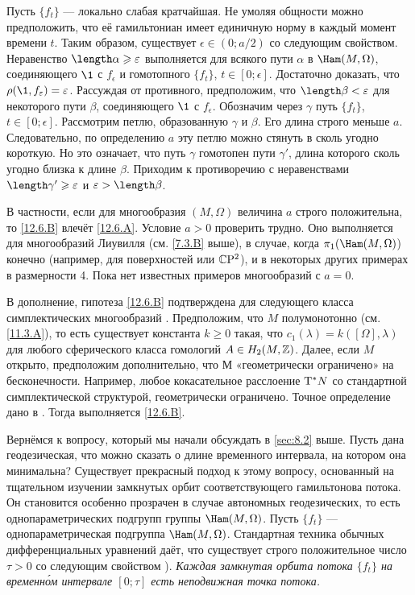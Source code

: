 Пусть $\{f_t\}$ — локально слабая кратчайшая.
Не умоляя общности можно предположить, что её гамильтониан имеет единичную норму в каждый момент времени $t$.
Таким образом, существует $\epsilon \in (0; a/2)$ со следующим свойством.
Неравенство $\length\alpha \ge \epsilon$ выполняется для всякого пути $\alpha$ в $\Ham(M, \Omega)$, соединяющего $\1$ с $f_\epsilon$ и гомотопного $\{f_t\}$, $t\in[0; \epsilon]$.
Достаточно доказать, что $\rho(\1, f_\epsilon) = \epsilon$.
Рассуждая от противного, предположим, что $\length \beta < \epsilon$ для некоторого пути $\beta$, соединяющего $\1$ с $f_\epsilon$.
Обозначим через $\gamma$ путь $\{f_t\}$, $t\in[0; \epsilon]$.
Рассмотрим петлю, образованную $\gamma$ и $\beta$.
Его длина строго меньше $a$.
Следовательно, по определению $a$ эту петлю можно стянуть в сколь угодно короткую.
Но это означает, что путь $\gamma$ гомотопен пути $\gamma'$, длина которого сколь угодно близка к длине $\beta$.
Приходим к противоречию с неравенствами $\length \gamma' \ge\epsilon$ и $\epsilon > \length \beta$.
\qeds

В частности, если для многообразия $(M,\Omega)$ величина $a$ строго положительна, то \ref{12.6.B} влечёт \ref{12.6.A}.
Условие $a > 0$ проверить трудно.
Оно выполняется для многообразий Лиувилля (см. \ref{7.3.B} выше), в случае, когда $\pi_1(\Ham(M, \Omega)$) конечно (например, для поверхностей или $\mathbb{C}\mathrm{P}^2$), и в некоторых других примерах в размерности 4.
Пока нет известных примеров многообразий с $a = 0$.

В дополнение, гипотеза \ref{12.6.B} подтверждена для следующего класса симплектических многообразий \cite{LM2}.
Предположим, что $M$ полумонотонно (см. \ref{11.3.A}), то есть существует константа $k \ge 0$ такая, что $c_1(\lambda) = k([\Omega],\lambda)$ для любого сферического класса гомологий $A \in H_2 (M, \mathbb{Z})$.
Далее, если $M$ открыто, предположим дополнительно, что $М$ «геометрически ограничено» на бесконечности.
Например, любое кокасательное расслоение $\mathrm{T}^\ast N$ со стандартной симплектической структурой, геометрически ограничено.
Точное определение дано в \cite{AL}.
Тогда выполняется \ref{12.6.B}.

Вернёмся к вопросу, который мы начали обсуждать в \ref{sec:8.2} выше.
Пусть дана геодезическая, что можно сказать о длине временного интервала, на котором она минимальна?
Существует прекрасный подход к этому вопросу, основанный на тщательном изучении замкнутых орбит соответствующего гамильтонова потока.
Он становится особенно прозрачен в случае автономных геодезических, то есть однопараметрических подгрупп группы $\Ham(M, \Omega)$.
Пусть $\{f_t\}$ — однопараметрическая подгруппа $\Ham(M, \Omega)$.
Стандартная техника обычных дифференциальных уравнений даёт, что существует строго положительное число $\tau > 0$ со следующим свойством \cite[Sec. 5.7]{HZ}).
\emph{Каждая замкнутая орбита потока $\{f_t\}$ на временн\'{о}м интервале $[0; \tau]$ есть неподвижная точка потока.}

